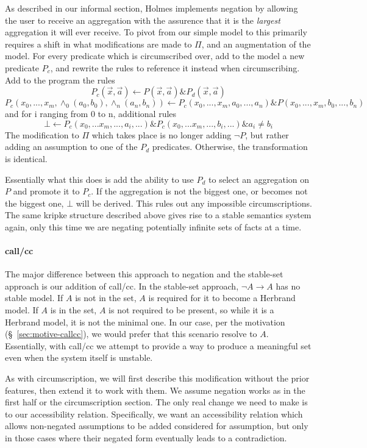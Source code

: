 As described in our informal section, Holmes implements negation by allowing the user to receive an aggregation with the assurence that it is the \emph{largest} aggregation it will ever receive.
To pivot from our simple model to this primarily requires a shift in what modifications are made to $\Pi$, and an augmentation of the model.
For every predicate which is circumscribed over, add to the model a new predicate $P_c$, and rewrite the rules to reference it instead when circumscribing.
Add to the program the rules
\[P_c(\vec{x}, \vec{a}) \leftarrow P(\vec{x}, \vec{a}) \& P_d(\vec{x}, \vec{a})\]
\[P_c(x_0, ..., x_m, \wedge_0(a_0, b_0), \wedge_n(a_n, b_n)) \leftarrow P_c(x_0, ..., x_m, a_0, ..., a_n) \& P(x_0, ..., x_m, b_0, ..., b_n)\]
and for i ranging from 0 to n, additional rules
\[\bot \leftarrow P_c(x_0, ... x_m, ..., a_i, ...) \& P_c(x_0, ... x_m, ..., b_i, ...) \& a_i \neq b_i\]
The modification to $\Pi$ which takes place is no longer adding $\neg P$, but rather adding an assumption to one of the $P_d$ predicates.
Otherwise, the transformation is identical.

Essentially what this does is add the ability to use $P_d$ to select an aggregation on $P$ and promote it to $P_c$.
If the aggregation is not the biggest one, or becomes not the biggest one, $\bot$ will be derived.
This rules out any impossible circumscriptions.
The same kripke structure described above gives rise to a stable semantics system again, only this time we are negating potentially infinite sets of facts at a time.
\paragraph{call/cc}
The major difference between this approach to negation and the stable-set approach is our addition of call/cc.
In the stable-set approach, $\neg A \rightarrow A$ has no stable model.
If $A$ is not in the set, $A$ is required for it to become a Herbrand model.
If $A$ is in the set, $A$ is not required to be present, so while it is a Herbrand model, it is not the minimal one.
In our case, per the motivation (\S~\ref{sec:motive-callcc}), we would prefer that this scenario resolve to $A$.
Essentially, with call/cc we attempt to provide a way to produce a meaningful set even when the system itself is unstable.

As with circumscription, we will first describe this modification without the prior features, then extend it to work with them.
We assume negation works as in the first half or the circumscription section.
The only real change we need to make is to our accessibility relation.
Specifically, we want an accessibility relation which allows non-negated assumptions to be added considered for assumption, but only in those cases where their negated form eventually leads to a contradiction.

